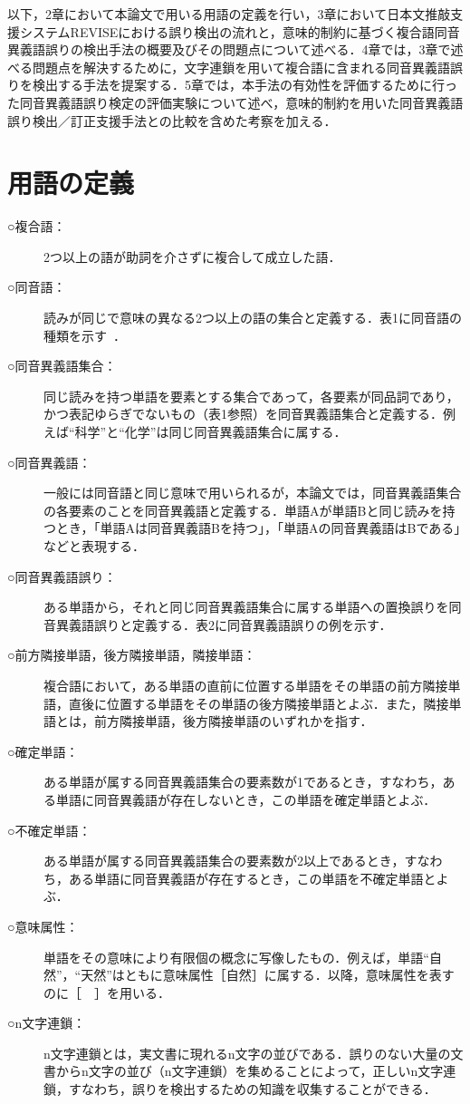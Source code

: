 以下，2章において本論文で用いる用語の定義を行い，3章において日本文推敲支援システムREVISEにおける誤り検出の流れと，意味的制約に基づく複合語同音異義語誤りの検出手法の概要及びその問題点について述べる．4章では，3章で述べる問題点を解決するために，文字連鎖を用いて複合語に含まれる同音異義語誤りを検出する手法を提案する．5章では，本手法の有効性を評価するために行った同音異義語誤り検定の評価実験について述べ，意味的制約を用いた同音異義語誤り検出／訂正支援手法との比較を含めた考察を加える．

\section{用語の定義}
\begin{description}
\item[○複合語：]
2つ以上の語が助詞を介さずに複合して成立した語．
\item[○同音語：]
読みが同じで意味の異なる2つ以上の語の集合と定義する．表1に同音語の種類を示す~\cite{OshimaAndAbeAndYuuraAndTakeichi1986}．
\item[○同音異義語集合：]
同じ読みを持つ単語を要素とする集合であって，各要素が同品詞であり，かつ表記ゆらぎでないもの（表1参照）を同音異義語集合と定義する．例えば“科学”と“化学”は同じ同音異義語集合に属する．
\item[○同音異義語：]
一般には同音語と同じ意味で用いられるが，本論文では，同音異義語集合の各要素のことを同音異義語と定義する．単語Aが単語Bと同じ読みを持つとき，「単語Aは同音異義語Bを持つ」，「単語Aの同音異義語はBである」などと表現する．
\item[○同音異義語誤り：]
ある単語から，それと同じ同音異義語集合に属する単語への置換誤りを同音異義語誤りと定義する．表2に同音異義語誤りの例を示す．

\begin{figure}[htbp]
\begin{center}
\end{center}
\end{figure}

\item[○前方隣接単語，後方隣接単語，隣接単語：]
複合語において，ある単語の直前に位置する単語をその単語の前方隣接単語，直後に位置する単語をその単語の後方隣接単語とよぶ．また，隣接単語とは，前方隣接単語，後方隣接単語のいずれかを指す．
\item[○確定単語：]
ある単語が属する同音異義語集合の要素数が1であるとき，すなわち，ある単語に同音異義語が存在しないとき，この単語を確定単語とよぶ．
\item[○不確定単語：]
ある単語が属する同音異義語集合の要素数が2以上であるとき，すなわち，ある単語に同音異義語が存在するとき，この単語を不確定単語とよぶ．
\item[○意味属性：]
単語をその意味により有限個の概念に写像したもの．例えば，単語“自然”，“天然”はともに意味属性［自然］に属する．以降，意味属性を表すのに［　］を用いる．
\item[○n文字連鎖：]
n文字連鎖とは，実文書に現れるn文字の並びである．誤りのない大量の文書からn文字の並び（n文字連鎖）を集めることによって，正しいn文字連鎖，すなわち，誤りを検出するための知識を収集することができる．
\end{description}

